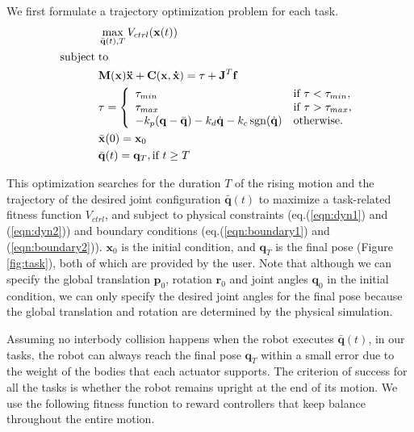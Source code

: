 We first formulate a trajectory optimization problem for each task.
\begin{align}
 \label{eqn:obj}&\max_{\bar{\mathbf{q}}(t),T} V_{ctrl}(\mathbf{x}(t))\\
\nonumber  \mathrm{subject\;} &\mathrm{to} \\
\label{eqn:dyn1} & \mathbf{M}(\mathbf{x})\mathbf{\ddot{x}}+\mathbf{C}(\mathbf{x},\mathbf{\dot{x}}) =\tau + \mathbf{J}^T\mathbf{f}\\
\label{eqn:dyn2} &\tau =
  \left\{
    \begin{array}{ll}
      \tau_{min} & \text{if }\tau < \tau_{min},\\
      \tau_{max} & \text{if }\tau > \tau_{max},\\
      -k_p(\mathbf{q}-\bar{\mathbf{q}}) - k_d\dot{\mathbf{q}} - k_c\operatorname{sgn}(\dot{\mathbf{q}}) & \text{otherwise.}\\
    \end{array}
  \right.\\
\label{eqn:boundary1}&\bar{\mathbf{x}}(0) = \mathbf{x}_0\\
\label{eqn:boundary2}&\bar{\mathbf{q}}(t) = \mathbf{q}_T, \text{if } t \geq T
\end{align}

This optimization searches for the duration $T$ of the rising motion and the trajectory of the desired joint configuration $\bar{\mathbf{q}}(t)$ to maximize a task-related fitness function $V_{ctrl}$, and subject to physical constraints (eq.(\ref{eqn:dyn1}) and (\ref{eqn:dyn2})) and boundary conditions (eq.(\ref{eqn:boundary1}) and (\ref{eqn:boundary2})). $\mathbf{x}_0$ is the initial condition, and $\mathbf{q}_T$ is the final pose (Figure \ref{fig:task}), both of which are provided by the user. Note that although we can specify the global translation $\mathbf{p}_0$, rotation $\mathbf{r}_0$ and joint angles $\mathbf{q}_0$ in the initial condition, we can only specify the desired joint angles for the final pose because the global translation and rotation are determined by the physical simulation.

Assuming no interbody collision happens when the robot executes $\bar{\mathbf{q}}(t)$, in our tasks, the robot can always reach the final pose $\mathbf{q}_T$ within a small error due to the weight of the bodies that each actuator supports. The criterion of success for all the tasks is whether the robot remains upright at the end of its motion. We use the following fitness function to reward controllers that keep balance throughout the entire motion.

